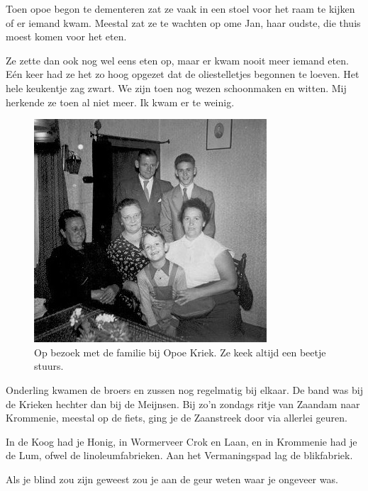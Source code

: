 \documentclass[10pt,twoside, openright]{memoir}
\begin{document}
Toen opoe begon te dementeren zat ze vaak in een stoel voor het raam te kijken of er iemand kwam. Meestal zat ze te wachten op ome Jan, haar oudste, die thuis moest komen voor het eten. 

Ze zette dan ook nog wel eens eten op, maar er kwam nooit meer iemand eten. Eén keer had ze het zo hoog opgezet dat de oliestelletjes begonnen te loeven. Het hele keukentje zag zwart. We zijn toen nog wezen schoonmaken en witten. Mij herkende ze toen al niet meer. Ik kwam er te weinig.

\begin{figure}
\includegraphics[width=\textwidth]{img/ch3/opbezoek}
\caption*{\footnotesize Op bezoek met de familie bij Opoe Kriek. Ze keek altijd een beetje stuurs.}
\end{figure}

Onderling kwamen de broers en zussen nog regelmatig bij elkaar. De band was bij de Krieken hechter dan bij de Meijnsen. Bij zo’n zondags ritje van Zaandam naar Krommenie, meestal op de fiets, ging je de Zaanstreek door via allerlei geuren. 

In de Koog had je Honig, in Wormerveer Crok en Laan, en in Krommenie had je de Lum, ofwel de linoleumfabrieken. Aan het Vermaningspad lag de blikfabriek. 

Als je blind zou zijn geweest zou je aan de geur weten waar je ongeveer was. 
\end{document}
